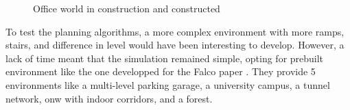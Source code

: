\documentclass[11pt]{article}
\begin{document}
    \begin{figure}[H]
        \centering
        \caption{Office world in construction and constructed}
        \label{fig:office_world}
    \end{figure}

    To test the planning algorithms, a more complex environment with more ramps, stairs, and difference in level would have been interesting to develop. However, a lack of time meant that the simulation remained simple, opting for prebuilt environment like the one developped for the Falco paper \cite{zhang2020falco}. They provide 5 environments like a multi-level parking garage, a university campus, a tunnel network, onw with indoor corridors, and a forest. 
    
\end{document}

